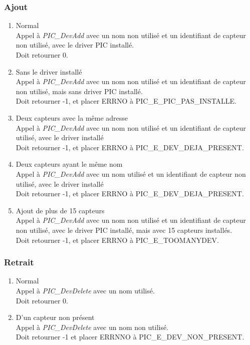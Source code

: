     \subsubsection{Ajout}
        \begin{enumerate}
            \item Normal\\
Appel à \textsl{PIC\_DevAdd} avec un nom non utilisé et un identifiant de capteur
non utilisé, avec le driver PIC installé.\\
Doit retourner 0.
            \item Sans le driver installé\\
Appel à \textsl{PIC\_DevAdd} avec un nom non utilisé et un identifiant de capteur
non utilisé, mais sans driver PIC installé.\\
Doit retourner -1, et placer ERRNO à PIC\_E\_PIC\_PAS\_INSTALLE.
            \item Deux capteurs avec la même adresse\\
Appel à \textsl{PIC\_DevAdd} avec un nom non utilisé et un identifiant de capteur
 utilisé, avec le driver installé\\
Doit retourner -1, et placer ERRNO à PIC\_E\_DEV\_DEJA\_PRESENT. 
            \item Deux capteurs ayant le même nom\\
Appel à \textsl{PIC\_DevAdd} avec un nom utilisé et un identifiant de capteur
 non utilisé, avec le driver installé\\
Doit retourner -1, et placer ERRNO à PIC\_E\_DEV\_DEJA\_PRESENT. 
            \item Ajout de plus de 15 capteurs\\
Appel à \textsl{PIC\_DevAdd} avec un nom non utilisé et un identifiant de capteur
non utilisé, avec le driver PIC installé, mais avec 15 capteurs installés.\\
Doit retourner -1, et placer ERRNO à PIC\_E\_TOOMANYDEV. 
        \end{enumerate}

    \subsubsection{Retrait}
        \begin{enumerate}
            \item Normal\\
Appel à \textsl{PIC\_DevDelete} avec un nom utilisé.\\
Doit retourner 0.
            \item D'un capteur non présent\\
Appel à \textsl{PIC\_DevDelete} avec un nom non utilisé.\\
Doit retourner -1 et placer ERRNNO à PIC\_E\_DEV\_NON\_PRESENT.
        \end{enumerate}
